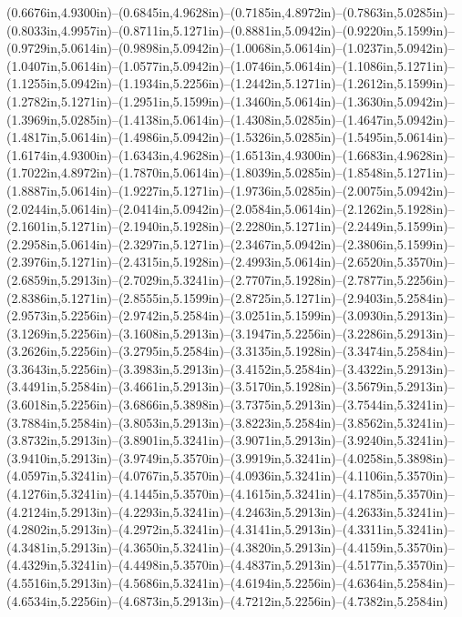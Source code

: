 (0.6676in,4.9300in)--(0.6845in,4.9628in)--(0.7185in,4.8972in)--(0.7863in,5.0285in)--(0.8033in,4.9957in)--(0.8711in,5.1271in)--(0.8881in,5.0942in)--(0.9220in,5.1599in)--(0.9729in,5.0614in)--(0.9898in,5.0942in)--(1.0068in,5.0614in)--(1.0237in,5.0942in)--(1.0407in,5.0614in)--(1.0577in,5.0942in)--(1.0746in,5.0614in)--(1.1086in,5.1271in)--(1.1255in,5.0942in)--(1.1934in,5.2256in)--(1.2442in,5.1271in)--(1.2612in,5.1599in)--(1.2782in,5.1271in)--(1.2951in,5.1599in)--(1.3460in,5.0614in)--(1.3630in,5.0942in)--(1.3969in,5.0285in)--(1.4138in,5.0614in)--(1.4308in,5.0285in)--(1.4647in,5.0942in)--(1.4817in,5.0614in)--(1.4986in,5.0942in)--(1.5326in,5.0285in)--(1.5495in,5.0614in)--(1.6174in,4.9300in)--(1.6343in,4.9628in)--(1.6513in,4.9300in)--(1.6683in,4.9628in)--(1.7022in,4.8972in)--(1.7870in,5.0614in)--(1.8039in,5.0285in)--(1.8548in,5.1271in)--(1.8887in,5.0614in)--(1.9227in,5.1271in)--(1.9736in,5.0285in)--(2.0075in,5.0942in)--(2.0244in,5.0614in)--(2.0414in,5.0942in)--(2.0584in,5.0614in)--(2.1262in,5.1928in)--(2.1601in,5.1271in)--(2.1940in,5.1928in)--(2.2280in,5.1271in)--(2.2449in,5.1599in)--(2.2958in,5.0614in)--(2.3297in,5.1271in)--(2.3467in,5.0942in)--(2.3806in,5.1599in)--(2.3976in,5.1271in)--(2.4315in,5.1928in)--(2.4993in,5.0614in)--(2.6520in,5.3570in)--(2.6859in,5.2913in)--(2.7029in,5.3241in)--(2.7707in,5.1928in)--(2.7877in,5.2256in)--(2.8386in,5.1271in)--(2.8555in,5.1599in)--(2.8725in,5.1271in)--(2.9403in,5.2584in)--(2.9573in,5.2256in)--(2.9742in,5.2584in)--(3.0251in,5.1599in)--(3.0930in,5.2913in)--(3.1269in,5.2256in)--(3.1608in,5.2913in)--(3.1947in,5.2256in)--(3.2286in,5.2913in)--(3.2626in,5.2256in)--(3.2795in,5.2584in)--(3.3135in,5.1928in)--(3.3474in,5.2584in)--(3.3643in,5.2256in)--(3.3983in,5.2913in)--(3.4152in,5.2584in)--(3.4322in,5.2913in)--(3.4491in,5.2584in)--(3.4661in,5.2913in)--(3.5170in,5.1928in)--(3.5679in,5.2913in)--(3.6018in,5.2256in)--(3.6866in,5.3898in)--(3.7375in,5.2913in)--(3.7544in,5.3241in)--(3.7884in,5.2584in)--(3.8053in,5.2913in)--(3.8223in,5.2584in)--(3.8562in,5.3241in)--(3.8732in,5.2913in)--(3.8901in,5.3241in)--(3.9071in,5.2913in)--(3.9240in,5.3241in)--(3.9410in,5.2913in)--(3.9749in,5.3570in)--(3.9919in,5.3241in)--(4.0258in,5.3898in)--(4.0597in,5.3241in)--(4.0767in,5.3570in)--(4.0936in,5.3241in)--(4.1106in,5.3570in)--(4.1276in,5.3241in)--(4.1445in,5.3570in)--(4.1615in,5.3241in)--(4.1785in,5.3570in)--(4.2124in,5.2913in)--(4.2293in,5.3241in)--(4.2463in,5.2913in)--(4.2633in,5.3241in)--(4.2802in,5.2913in)--(4.2972in,5.3241in)--(4.3141in,5.2913in)--(4.3311in,5.3241in)--(4.3481in,5.2913in)--(4.3650in,5.3241in)--(4.3820in,5.2913in)--(4.4159in,5.3570in)--(4.4329in,5.3241in)--(4.4498in,5.3570in)--(4.4837in,5.2913in)--(4.5177in,5.3570in)--(4.5516in,5.2913in)--(4.5686in,5.3241in)--(4.6194in,5.2256in)--(4.6364in,5.2584in)--(4.6534in,5.2256in)--(4.6873in,5.2913in)--(4.7212in,5.2256in)--(4.7382in,5.2584in) 